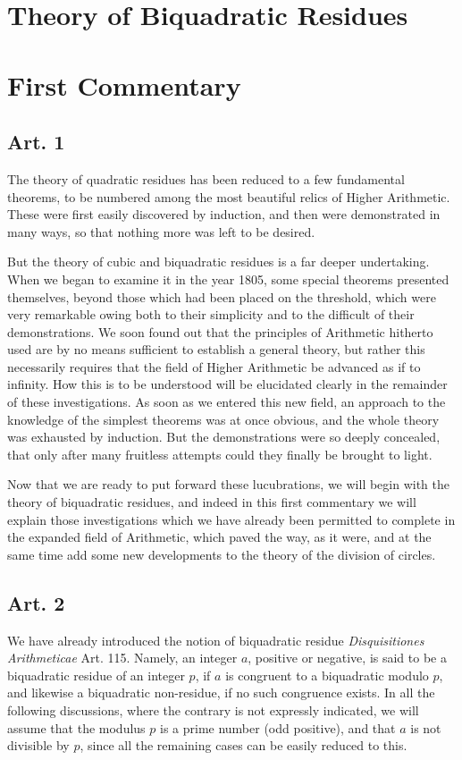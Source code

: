 \documentclass{book}
\theoremstyle{plain}
\theoremstyle{remark}
\begin{document}
\section*{ Theory of Biquadratic Residues \\ \hspace{1mm} \\ First Commentary }

\subsection*{Art. 1} 

The theory of quadratic residues has been reduced to a few fundamental theorems, to be numbered among the most beautiful relics of Higher Arithmetic.  These were first easily discovered by induction, and then were demonstrated in many ways, so that nothing more was left to be desired.

But the theory of cubic and biquadratic residues is a far deeper undertaking.  When we began to examine it in the year 1805, some special theorems presented themselves, beyond those which had been placed on the threshold, which were very remarkable owing both to their simplicity and to the difficult of their demonstrations.   We soon found out that the principles of Arithmetic hitherto used are by no means sufficient to establish a general theory, but rather this necessarily requires that the field of Higher Arithmetic be advanced as if to infinity.  How this is to be understood will be elucidated clearly in the remainder of these investigations.  As soon as we entered this new field, an approach to the knowledge of the simplest theorems was at once obvious, and the whole theory was exhausted by induction.   But the demonstrations were so deeply concealed, that only after many fruitless attempts could they finally be brought to light.

Now that we are ready to put forward these lucubrations, we will begin with the theory of biquadratic residues, and indeed in this first commentary we will explain those investigations which we have already been permitted to complete in the expanded field of Arithmetic, which paved the way, as it were, and at the same time add some new developments to the theory of the division of circles.

\subsection*{Art. 2}

We have already introduced the notion of biquadratic residue  \textit{Disquisitiones Arithmeticae} Art. 115.  Namely, an integer $a$, positive or negative, is said to be a biquadratic residue of an integer $p$, if $a$ is congruent to a biquadratic modulo $p$, and likewise a biquadratic non-residue, if no such congruence exists.  In all the following discussions, where the contrary is not expressly indicated, we will assume that the modulus $p$ is a prime number (odd positive), and that $a$ is not divisible by $p$, since all the remaining cases can be easily reduced to this.
\end{document}
